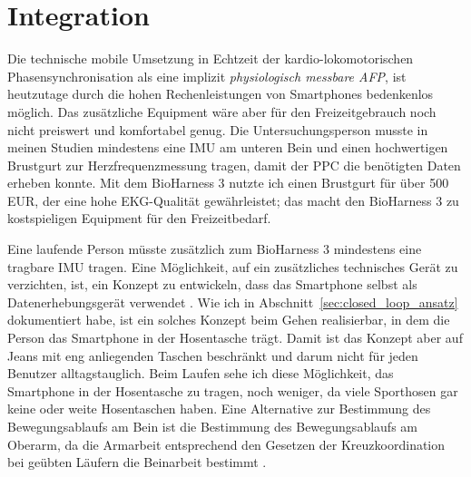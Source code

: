 \section{Integration} 

\label{sec:integration}

Die technische mobile Umsetzung in Echtzeit der kardio-lokomotorischen Phasensynchronisation als eine implizit \emph{physiologisch messbare \ac{AFP}}, ist heutzutage durch die hohen Rechenleistungen von Smartphones bedenkenlos möglich. Das zusätzliche Equipment wäre aber für den Freizeitgebrauch noch nicht preiswert und komfortabel genug. Die Untersuchungsperson musste in meinen Studien mindestens eine \ac{IMU} am unteren Bein und einen hochwertigen Brustgurt zur Herzfrequenzmessung tragen, damit der \ac{PPC} die benötigten Daten erheben konnte. Mit dem BioHarness 3 nutzte ich einen Brustgurt für über 500 EUR, der eine hohe \ac{EKG}-Qualität gewährleistet; das macht den BioHarness 3 zu kostspieligen Equipment für den Freizeitbedarf. 

Eine laufende Person müsste zusätzlich zum BioHarness 3 mindestens eine tragbare \ac{IMU} tragen. Eine Möglichkeit, auf ein zusätzliches technisches Gerät zu verzichten, ist, ein Konzept zu entwickeln, dass das Smartphone selbst als Datenerhebungsgerät verwendet \citep{Strohrmann2013, Strohrmann2014}. Wie ich in Abschnitt~\ref{sec:closed_loop_ansatz} dokumentiert habe, ist ein solches Konzept beim Gehen realisierbar, in dem die Person das Smartphone in der Hosentasche trägt. Damit ist das Konzept aber auf Jeans mit eng anliegenden Taschen beschränkt und darum nicht für jeden Benutzer alltagstauglich. Beim Laufen sehe ich diese Möglichkeit, das Smartphone in der Hosentasche zu tragen, noch weniger, da viele Sporthosen gar keine oder weite Hosentaschen haben. Eine Alternative zur Bestimmung des Bewegungsablaufs am Bein ist die Bestimmung des Bewegungsablaufs am Oberarm, da die Armarbeit entsprechend den Gesetzen der Kreuzkoordination bei geübten Läufern die Beinarbeit bestimmt \citep[][S.~70]{Marquardt2011}.


